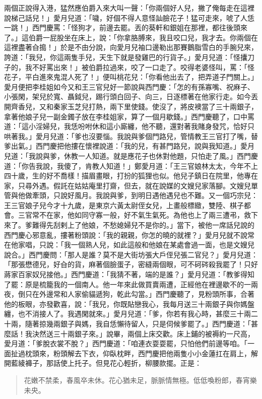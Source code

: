 兩個正說得入港，猛然應伯爵入來大叫一聲：「你兩個好人兒，撇了俺每走在這裡說梯己話兒！」愛月兒道：「噦，好個不得人意怪訕臉花子！猛可走來，唬了人恁一跳！」西門慶罵：「怪狗才，前邊去罷。丟的葵軒和銀姐在那裡，都往後頭來了。」這伯爵一屁股坐在床上，說：「你拿胳膊來，我且咬口兒，我才去。你兩個在這裡盡著㒲搗！」於是不由分說，向愛月兒袖口邊勒出那賽鵝脂雪白的手腕兒來，誇道：「我兒，你這兩隻手兒，天生下就是發雞巴的行貨子。」愛月兒道：「怪攮刀子的，我不好罵出來！」被伯爵拉過來，咬了一口走了。咬得老婆怪叫，罵：「怪花子，平白進來鬼混人死了！」便叫桃花兒：「你看他出去了，把弄道子門關上。」愛月便把李桂姐如今又和王三官兒好一節說與西門慶：「怎的有孫寡嘴、祝麻子、小張閑，架兒於寬、聶鉞兒，踢行頭白回子、向三，日逐標著在他家行走。如今丟開齊香兒，又和秦家玉芝兒打熱，兩下里使錢。使沒了，將皮襖當了三十兩銀子，拿著他娘子兒一副金鐲子放在李桂姐家，算了一個月歇錢。」西門慶聽了，口中罵道：「這小淫婦兒，我恁吩咐休和這小廝纏，他不聽，還對著我賭身發咒，恰好只哄著我。」愛月兒道：「爹也沒要惱。我說與爹個門路兒，管情教王三官打了嘴，替爹出氣。」西門慶把他摟在懷裡說道：「我的兒，有甚門路兒，說與我知道。」愛月兒道：「我說與爹，休教一人知道。就是應花子也休對他題，只怕走了風。」西門慶道：「你告我說，我傻了，肯教人知道！」鄭愛月道：「王三官娘林太太，今年不上四十歲，生的好不喬樣！描眉畫眼，打扮的狐狸也似。他兒子鎮日在院里，他專在家，只尋外遇。假託在姑姑庵里打齋，但去，就在說媒的文嫂兒家落腳。文嫂兒單管與他做牽頭，只說好風月。我說與爹，到明日遇他遇兒也不難。又一個巧宗兒：王三官娘子兒今才十九歲，是東京六黃太尉侄女兒，上畫般標緻，雙陸、棋子都會。三官常不在家，他如同守寡一般，好不氣生氣死。為他也上了兩三遭弔，救下來了。爹難得先刮剌上了他娘，不愁媳婦兒不是你的。」當下，被他一席話兒說的西門慶心邪意亂，摟著粉頭說：「我的親親，你怎的曉的就裡？」愛月兒就不說常在他家唱，只說：「我一個熟人兒，如此這般和他娘在某處會過一面，也是文嫂兒說合。」西門慶問：「那人是誰？莫不是大街坊張大戶侄兒張二官兒？」愛月兒道：「那張懋德兒，好㒲的貨，麻著個臉蛋子，密縫兩個眼，可不砢硶殺我罷了！只好蔣家百家奴兒接他。」西門慶道：「我猜不著，端的是誰？」愛月兒道：「教爹得知了罷：原是梳籠我的一個南人。他一年來此做買賣兩遭，正經他在裡邊歇不的一兩夜，倒只在外邊常和人家偷貓遞狗，乾此勾當。」西門慶聽了，見粉頭所事，合著他的板眼，亦發歡喜，說：「我兒，你既貼戀我心，我每月送三十兩銀子與你媽盤纏，也不消接人了。我遇閑就來。」愛月兒道：「爹，你若有我心時，甚麼三十兩二十兩，隨著掠幾兩銀子與媽，我自恁懶待留人，只是伺候爹罷了。」西門慶道：「甚麼話！我決然送三十兩銀子來。」說畢，兩個上床交歡。床上鋪的被褥約一尺高，愛月道：「爹脫衣裳不脫？」西門慶道：「咱連衣耍耍罷，只怕他們前邊等咱。「一面扯過枕頭來，粉頭解去下衣，仰臥枕畔，西門慶把他兩隻小小金蓮扛在肩上，解開藍綾褲子，那話使上托子。但見花心輕折，柳腰款擺。正是：
\begin{quote}
花嫩不禁柔，春風卒未休。花心猶未足，脈脈情無極。低低喚粉郎，春宵樂未央。
\end{quote}

